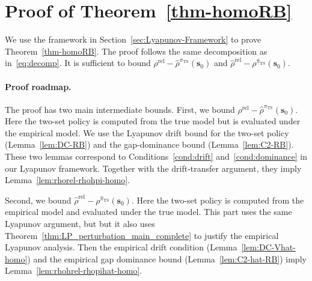 \documentclass[mnsc,nonblindrev]{informs3}
\newcommand{\pits}{\pi_{\mathrm{TS}}}
\newcommand{\pihts}{\widehat{\pi}_{\mathrm{TS}}}
\newcommand{\bms}{\bm{s}}
\begin{document}
\section{Proof of Theorem~\ref{thm-homoRB}}
\label{sec:proof_outline_thm_RB}

We use the framework in Section~\ref{sec:Lyapunov-Framework} to prove
Theorem~\ref{thm-homoRB}. The proof follows the same decomposition
as in~\eqref{eq:decomp}. It is sufficient to bound
\(\rho^{\mathrm{rel}}-\widehat\rho^{\pits}(\bms_0)\) and
\(\widehat\rho^{\mathrm{rel}}-\rho^{\pihts}(\bms_0)\).

\paragraph{Proof roadmap.} The proof has two main intermediate bounds. First, we bound
\(\rho^{\mathrm{rel}}-\widehat\rho^{\pits}(\bms_0)\). Here the two-set
policy is computed from the true model but is evaluated
under the empirical model. We use the Lyapunov drift bound for the two-set
policy (Lemma~\ref{lem:DC-RB}) and the gap-dominance bound
(Lemma~\ref{lem:C2-RB}). These two lemmas correspond to
Conditions~\ref{cond:drift} and~\ref{cond:dominance} in our Lyapunov
framework. Together with the drift-transfer argument, they imply
Lemma~\ref{lem:rhorel-rhohpi-homo}.

Second, we bound
\(\widehat\rho^{\mathrm{rel}}-\rho^{\pihts}(\bms_0)\). Here the two-set
policy is computed from the empirical model and evaluated under the true
model. This part uses the same Lyapunov argument, but but it also uses
Theorem~\ref{thm:LP_perturbation_main_complete} to justify the empirical Lyapunov analysis. Then the empirical drift condition
(Lemma~\ref{lem:DC-Vhat-homo}) and the empirical gap dominance bound
(Lemma~\ref{lem:C2-hat-RB}) imply
Lemma~\ref{lem:rhohrel-rhopihat-homo}.
\end{document}
